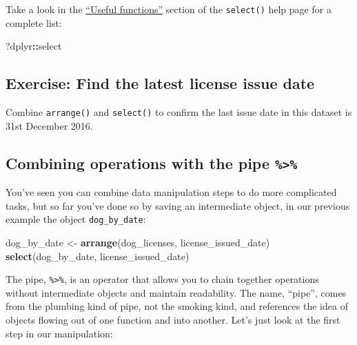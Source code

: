\documentclass[]{Nemilov}
\newenvironment{Shaded}{\begin{snugshade}}{\end{snugshade}}
\newcommand{\KeywordTok}[1]{\textcolor[rgb]{0.13,0.29,0.53}{\textbf{#1}}}
\newcommand{\NormalTok}[1]{#1}
\newcommand{\OperatorTok}[1]{\textcolor[rgb]{0.81,0.36,0.00}{\textbf{#1}}}
\newcommand{\StringTok}[1]{\textcolor[rgb]{0.31,0.60,0.02}{#1}}
\begin{document}
Take a look in the \href{https://dplyr.tidyverse.org/reference/select.html\#useful-functions}{``Useful functions''} section of the \texttt{select()} help page for a complete list:

\begin{Shaded}
\begin{Highlighting}[]
\NormalTok{?dplyr}\OperatorTok{::}\NormalTok{select}
\end{Highlighting}
\end{Shaded}

\hypertarget{exercise-find-the-latest-license-issue-date}{%
\subsection{Exercise: Find the latest license issue date}\label{exercise-find-the-latest-license-issue-date}}

Combine \texttt{arrange()} and \texttt{select()} to confirm the last issue date in this dataset is 31st December 2016.

\hypertarget{combining-operations-with-the-pipe}{%
\subsection{\texorpdfstring{Combining operations with the pipe \texttt{\%\textgreater{}\%}}{Combining operations with the pipe \%\textgreater{}\%}}\label{combining-operations-with-the-pipe}}

You've seen you can combine data manipulation steps to do more complicated tasks, but so far you've done so by saving an intermediate object, in our previous example the object \texttt{dog\_by\_date}:

\begin{Shaded}
\begin{Highlighting}[]
\NormalTok{dog_by_date <-}\StringTok{ }\KeywordTok{arrange}\NormalTok{(dog_licenses, license_issued_date)}
\KeywordTok{select}\NormalTok{(dog_by_date, license_issued_date)}
\end{Highlighting}
\end{Shaded}

The pipe, \texttt{\%\textgreater{}\%}, is an operator that allows you to chain together operations without intermediate objects and maintain readability. The name, ``pipe'', comes from the plumbing kind of pipe, not the smoking kind, and references the idea of objects flowing out of one function and into another. Let's just look at the first step in our manipulation:
\end{document}
